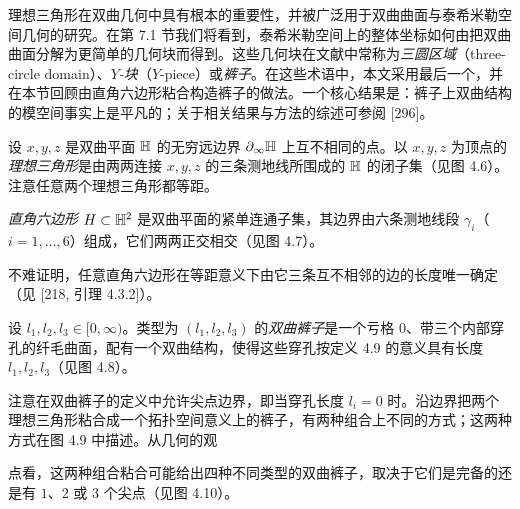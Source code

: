 理想三角形在双曲几何中具有根本的重要性，并被广泛用于双曲曲面与泰希米勒空间几何的研究。在第 7.1 节我们将看到，泰希米勒空间上的整体坐标如何由把双曲曲面分解为更简单的几何块而得到。这些几何块在文献中常称为\emph{三圆区域}（three-circle domain）、\emph{$Y$-块}（$Y$-piece）或\emph{裤子}。在这些术语中，本文采用最后一个，并在本节回顾由直角六边形粘合构造裤子的做法。一个核心结果是：裤子上双曲结构的模空间事实上是平凡的；关于相关结果与方法的综述可参阅 [296]。

\begin{definition}[4.11]
设 $x,y,z$ 是双曲平面 $\mathbb{H}$ 的无穷远边界 $\partial_\infty\mathbb{H}$ 上互不相同的点。以 $x,y,z$ 为顶点的\emph{理想三角形}是由两两连接 $x,y,z$ 的三条测地线所围成的 $\mathbb{H}$ 的闭子集（见图 4.6）。注意任意两个理想三角形都等距。
\end{definition}


\begin{definition}[4.12]
\emph{直角六边形} $H\subset\mathbb{H}^2$ 是双曲平面的紧单连通子集，其边界由六条测地线段 $\gamma_i$（$i=1,\dots,6$）组成，它们两两正交相交（见图 4.7）。
\end{definition}

不难证明，任意直角六边形在等距意义下由它三条互不相邻的边的长度唯一确定（见 [218, 引理 4.3.2]）。


\begin{definition}[4.13]
设 $l_1,l_2,l_3\in[0,\infty)$。类型为 $(l_1,l_2,l_3)$ 的\emph{双曲裤子}是一个亏格 $0$、带三个内部穿孔的纤毛曲面，配有一个双曲结构，使得这些穿孔按定义 4.9 的意义具有长度 $l_1,l_2,l_3$（见图 4.8）。
\end{definition}


注意在双曲裤子的定义中允许尖点边界，即当穿孔长度 $l_i=0$ 时。沿边界把两个理想三角形粘合成一个拓扑空间意义上的裤子，有两种组合上不同的方式；这两种方式在图 4.9 中描述。从几何的观

点看，这两种组合粘合可能给出四种不同类型的双曲裤子，取决于它们是完备的还是有 $1$、$2$ 或 $3$ 个尖点（见图 4.10）。

